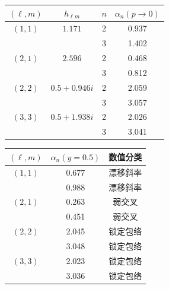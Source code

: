 \documentclass[UTF8,fontset=fandol,12pt,a4paper,oneside,openany]{ctexrep}
\begin{document}
\noindent\begin{minipage}{\linewidth}
\captionsetup{type=table}\caption{历史高阶局域幂的模态层级和路径比较，待复核。}\label{audit:tab:power-modal}
\centering\fontsize{10.5}{14}\selectfont
\setlength{\tabcolsep}{6pt}\renewcommand{\arraystretch}{1.2}
\par{}\par\smallskip
\begin{tabular}{cccc}\toprule
$(\ell,m)$ & $h_{\ell m}$ & $n$ & $\alpha_n(p\to0)$\\\midrule
$(1,1)$ & $1.171$ & 2 & 0.937\\
 &  & 3 & 1.402\\
$(2,1)$ & $2.596$ & 2 & 0.468\\
 &  & 3 & 0.812\\
$(2,2)$ & $0.5+0.946i$ & 2 & 2.059\\
 &  & 3 & 3.057\\
$(3,3)$ & $0.5+1.938i$ & 2 & 2.026\\
 &  & 3 & 3.041\\
\bottomrule\end{tabular}
\par\medskip
\par{}\par\smallskip
\begin{tabular}{ccc}\toprule
$(\ell,m)$ & $\alpha_n(y=0.5)$ & 数值分类\\\midrule
$(1,1)$ & 0.677 & 漂移斜率\\
 & 0.988 & 漂移斜率\\
$(2,1)$ & 0.263 & 弱交叉\\
 & 0.451 & 弱交叉\\
$(2,2)$ & 2.045 & 锁定包络\\
 & 3.048 & 锁定包络\\
$(3,3)$ & 2.023 & 锁定包络\\
 & 3.036 & 锁定包络\\
\bottomrule\end{tabular}
\end{minipage}\par\addvspace{10pt}
\par\addvspace{14pt}
\end{document}
